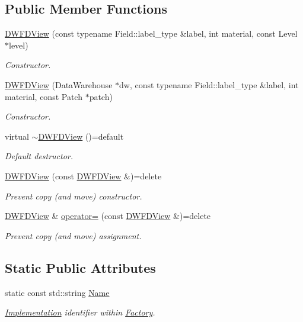 \subsection*{Public Member Functions}
\begin{DoxyCompactItemize}
\item 
\hyperlink{classUintah_1_1PhaseField_1_1DWFDView_ab115fc3f9a50511556f3334799cff71f}{D\+W\+F\+D\+View} (const typename Field\+::label\+\_\+type \&label, int material, const Level $\ast$level)
\begin{DoxyCompactList}\small\item\em Constructor. \end{DoxyCompactList}\item 
\hyperlink{classUintah_1_1PhaseField_1_1DWFDView_aa6e700338d012ad4f2861335dfebb09a}{D\+W\+F\+D\+View} (Data\+Warehouse $\ast$dw, const typename Field\+::label\+\_\+type \&label, int material, const Patch $\ast$patch)
\begin{DoxyCompactList}\small\item\em Constructor. \end{DoxyCompactList}\item 
virtual \hyperlink{classUintah_1_1PhaseField_1_1DWFDView_a3cad74abd5dc25b9bb855add2c00740f}{$\sim$\+D\+W\+F\+D\+View} ()=default
\begin{DoxyCompactList}\small\item\em Default destructor. \end{DoxyCompactList}\item 
\hyperlink{classUintah_1_1PhaseField_1_1DWFDView_ad30db301c5aea2f86106ef63e71eca9e}{D\+W\+F\+D\+View} (const \hyperlink{classUintah_1_1PhaseField_1_1DWFDView}{D\+W\+F\+D\+View} \&)=delete
\begin{DoxyCompactList}\small\item\em Prevent copy (and move) constructor. \end{DoxyCompactList}\item 
\hyperlink{classUintah_1_1PhaseField_1_1DWFDView}{D\+W\+F\+D\+View} \& \hyperlink{classUintah_1_1PhaseField_1_1DWFDView_a00271ff47c904609a0ae22f27e4c382d}{operator=} (const \hyperlink{classUintah_1_1PhaseField_1_1DWFDView}{D\+W\+F\+D\+View} \&)=delete
\begin{DoxyCompactList}\small\item\em Prevent copy (and move) assignment. \end{DoxyCompactList}\end{DoxyCompactItemize}
\subsection*{Static Public Attributes}
\begin{DoxyCompactItemize}
\item 
static const std\+::string \hyperlink{classUintah_1_1PhaseField_1_1DWFDView_a05d3a36d8ec564ad44ce85c2880abe1a}{Name}
\begin{DoxyCompactList}\small\item\em \hyperlink{classUintah_1_1PhaseField_1_1Implementation}{Implementation} identifier within \hyperlink{classUintah_1_1PhaseField_1_1Factory}{Factory}. \end{DoxyCompactList}\end{DoxyCompactItemize}
